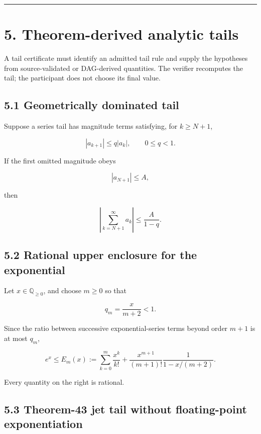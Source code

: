 \begin{center}\rule{0.5\linewidth}{0.5pt}\end{center}

\hypertarget{theorem-derived-analytic-tails}{%
\section{5. Theorem-derived analytic tails}\label{theorem-derived-analytic-tails}}

A tail certificate must identify an admitted tail rule and supply the hypotheses from source-validated or DAG-derived quantities. The verifier recomputes the tail; the participant does not choose its final value.

\hypertarget{geometrically-dominated-tail}{%
\subsection{5.1 Geometrically dominated tail}\label{geometrically-dominated-tail}}

Suppose a series tail has magnitude terms satisfying, for \(k\ge N+1\),

\[
|a_{k+1}|\le q|a_k|,
\qquad
0\le q<1.
\tag{5.1}
\]

If the first omitted magnitude obeys

\[
|a_{N+1}|\le A,
\]

then

\[
\boxed{
\left|\sum_{k=N+1}^{\infty}a_k\right|
\le
\frac{A}{1-q}.
}
\tag{5.2}
\]

\hypertarget{rational-upper-enclosure-for-the-exponential}{%
\subsection{5.2 Rational upper enclosure for the exponential}\label{rational-upper-enclosure-for-the-exponential}}

Let \(x\in\mathbb Q_{\ge0}\), and choose \(m\ge0\) so that

\[
q_m=\frac{x}{m+2}<1.
\tag{5.3}
\]

Since the ratio between successive exponential-series terms beyond order \(m+1\) is at most \(q_m\),

\[
\boxed{
e^x
\le
E_m(x)
:=
\sum_{k=0}^{m}\frac{x^k}{k!}
+
\frac{x^{m+1}}{(m+1)!}
\frac{1}{1-x/(m+2)}.
}
\tag{5.4}
\]

Every quantity on the right is rational.

\hypertarget{theorem-43-jet-tail-without-floating-point-exponentiation}{%
\subsection{5.3 Theorem-43 jet tail without floating-point exponentiation}\label{theorem-43-jet-tail-without-floating-point-exponentiation}}

